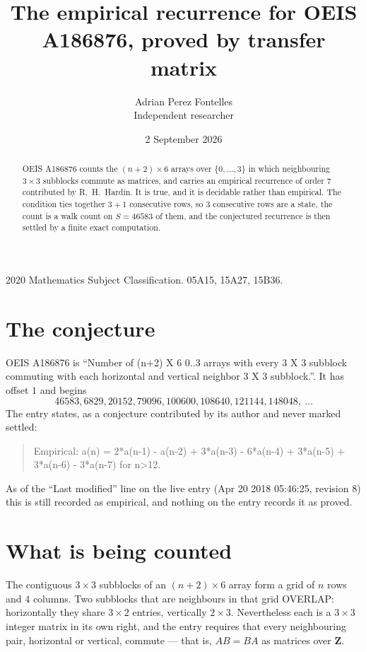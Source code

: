 \documentclass[11pt,a4paper]{article}
\title{The empirical recurrence for OEIS A186876, proved by transfer matrix}
\author{Adrian Perez Fontelles\\ \small Independent researcher}
\date{2 September 2026}
\theoremstyle{plain}
\theoremstyle{definition}
\begin{document}
\maketitle

\begin{abstract}
OEIS A186876 counts the $(n+2)\times6$ arrays over $\{0,\dots,3\}$ in which
neighbouring $3\times3$ subblocks commute as matrices, and carries an empirical
recurrence
of order $7$ contributed by R.~H.~Hardin. It is true, and it is decidable rather than
empirical. The condition ties together $3+1$ consecutive rows, so $3$ consecutive rows are
a state, the count is a walk count on $S=46583$ of them, and the conjectured recurrence is then
settled by a finite exact computation.
\end{abstract}

\noindent\small 2020 Mathematics Subject Classification. 05A15, 15A27, 15B36.\normalsize

\section{The conjecture}

OEIS A186876 is ``Number of (n+2) X 6 0..3 arrays with every 3 X 3 subblock commuting with each horizontal and vertical neighbor 3 X 3 subblock.''. It has offset $1$ and begins
\[
46583, 6829, 20152, 79096, 100600, 108640, 121144, 148048,\ \dots
\]
The entry states, as a conjecture contributed by its author and never marked settled:
\begin{quote}
Empirical: a(n) = 2*a(n-1) - a(n-2) + 3*a(n-3) - 6*a(n-4) + 3*a(n-5) + 3*a(n-6) - 3*a(n-7) for n>12.
\end{quote}
As of the ``Last modified'' line on the live entry (Apr 20 2018 05:46:25, revision 8) this is still
recorded as empirical, and nothing on the entry records it as proved.

\section{What is being counted}

The contiguous $3\times3$ subblocks of an $(n+2)\times6$ array form a grid of $n$
rows and $4$ columns. Two subblocks that are neighbours in that
grid OVERLAP: horizontally they share $3\times2$ entries, vertically
$2\times3$. Nevertheless each is a $3\times3$ integer matrix in its own right, and
the entry requires that every neighbouring pair, horizontal or vertical, commute --- that is,
$AB=BA$ as matrices over $\mathbf{Z}$.
\end{document}
